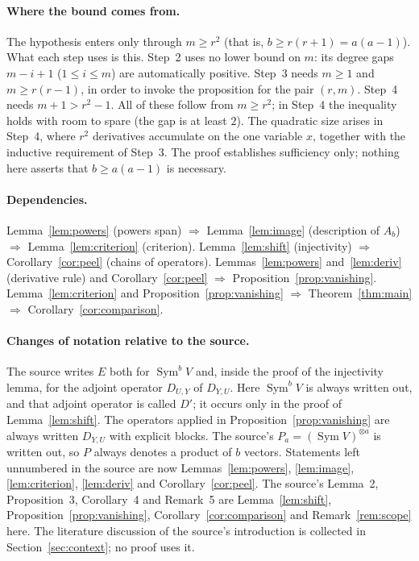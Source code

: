 \documentclass[11pt]{article}
\theoremstyle{remark}
\DeclareMathOperator{\Sym}{Sym}
\newcommand{\D}[2]{D_{#1,#2}}
\begin{document}
\paragraph{Where the bound comes from.}
The hypothesis enters only through $m\ge r^2$ (that is,
$b\ge r(r+1)=a(a-1)$). What each step uses is this. Step~2 uses no lower
bound on $m$: its degree gaps $m-i+1$ ($1\le i\le m$) are automatically
positive. Step~3 needs $m\ge1$ and $m\ge r(r-1)$, in order to invoke the
proposition for the pair $(r,m)$. Step~4 needs $m+1>r^2-1$. All of these
follow from $m\ge r^2$; in Step~4 the inequality holds with room to spare
(the gap is at least $2$). The quadratic size arises in Step~4, where $r^2$
derivatives accumulate on the one variable $x$, together with the inductive
requirement of Step~3. The proof establishes sufficiency only; nothing here
asserts that $b\ge a(a-1)$ is necessary.

\paragraph{Dependencies.}
Lemma~\ref{lem:powers} (powers span) $\Rightarrow$ Lemma~\ref{lem:image}
(description of $A_b$) $\Rightarrow$ Lemma~\ref{lem:criterion} (criterion).
Lemma~\ref{lem:shift} (injectivity) $\Rightarrow$ Corollary~\ref{cor:peel}
(chains of operators). Lemmas~\ref{lem:powers} and~\ref{lem:deriv}
(derivative rule) and Corollary~\ref{cor:peel} $\Rightarrow$
Proposition~\ref{prop:vanishing}. Lemma~\ref{lem:criterion} and
Proposition~\ref{prop:vanishing} $\Rightarrow$ Theorem~\ref{thm:main}
$\Rightarrow$ Corollary~\ref{cor:comparison}.

\paragraph{Changes of notation relative to the source.}
The source writes $E$ both for $\Sym^bV$ and, inside the proof of the
injectivity lemma, for the adjoint operator $\D{U}{Y}$ of $\D{Y}{U}$. Here
$\Sym^bV$ is always written out, and that adjoint operator is called $D'$;
it occurs only in the proof of Lemma~\ref{lem:shift}. The operators applied
in Proposition~\ref{prop:vanishing} are always written $\D{Y}{U}$ with
explicit blocks. The source's $P_a=(\Sym V)^{\otimes a}$ is written out, so
$P$ always denotes a product of $b$ vectors. Statements left unnumbered in
the source are now Lemmas~\ref{lem:powers}, \ref{lem:image},
\ref{lem:criterion}, \ref{lem:deriv} and Corollary~\ref{cor:peel}. The
source's Lemma~2, Proposition~3, Corollary~4 and Remark~5 are
Lemma~\ref{lem:shift}, Proposition~\ref{prop:vanishing},
Corollary~\ref{cor:comparison} and Remark~\ref{rem:scope} here. The
literature discussion of the source's introduction is collected in
Section~\ref{sec:context}; no proof uses it.
\end{document}
